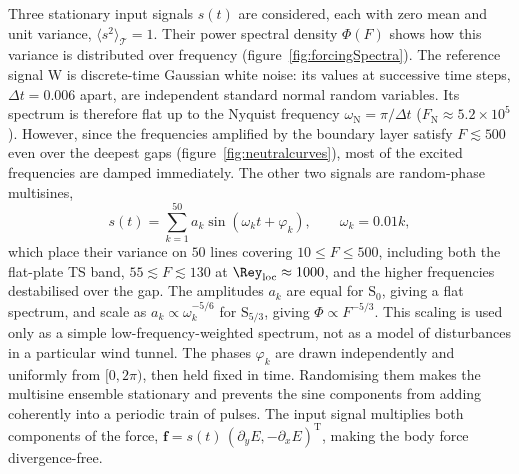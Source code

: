 \documentclass[lineno]{jfm}
\begin{document}
Three stationary input signals $s(t)$ are considered, each with zero mean and unit variance, ${\langle s^2\rangle}_\mathcal{T}=1$. Their power spectral density $\Phi(F)$ shows how this variance is distributed over frequency (figure~\ref{fig:forcingSpectra}). The reference signal W is discrete-time Gaussian white noise: its values at successive time steps, $\Delta t=0.006$ apart, are independent standard normal random variables. Its spectrum is therefore flat up to the Nyquist frequency $\omega_\mathrm{N}=\pi/\Delta t$ ($F_\mathrm{N}\approx5.2\times10^{5}$). However, since the frequencies amplified by the boundary layer satisfy $F\lesssim500$ even over the deepest gaps (figure~\ref{fig:neutralcurves}), most of the excited frequencies are damped immediately. The other two signals are random-phase multisines,
\begin{equation}\label{eq:multisine}
	s(t)=\sum_{k=1}^{50}a_k\sin(\omega_k t+\varphi_k),\qquad \omega_k=0.01k,
\end{equation}
which place their variance on $50$ lines covering $10\leq F\leq500$, including both the flat-plate \ac{TS} band, $55\lesssim F\lesssim130$ at $\Rey_\mathrm{loc}\approx1000$, and the higher frequencies destabilised over the gap. The amplitudes $a_k$ are equal for $\mathrm{S}_0$, giving a flat spectrum, and scale as $a_k\propto\omega_k^{-5/6}$ for $\mathrm{S}_{5/3}$, giving $\Phi\propto F^{-5/3}$. This scaling is used only as a simple low-frequency-weighted spectrum, not as a model of disturbances in a particular wind tunnel. The phases $\varphi_k$ are drawn independently and uniformly from $[0,2\pi)$, then held fixed in time. Randomising them makes the multisine ensemble stationary and prevents the sine components from adding coherently into a periodic train of pulses. The input signal multiplies both components of the force, $\boldsymbol{f}=s(t)\,{(\partial_y E,-\partial_x E)}^\mathrm{T}$, making the body force divergence-free.
\end{document}
